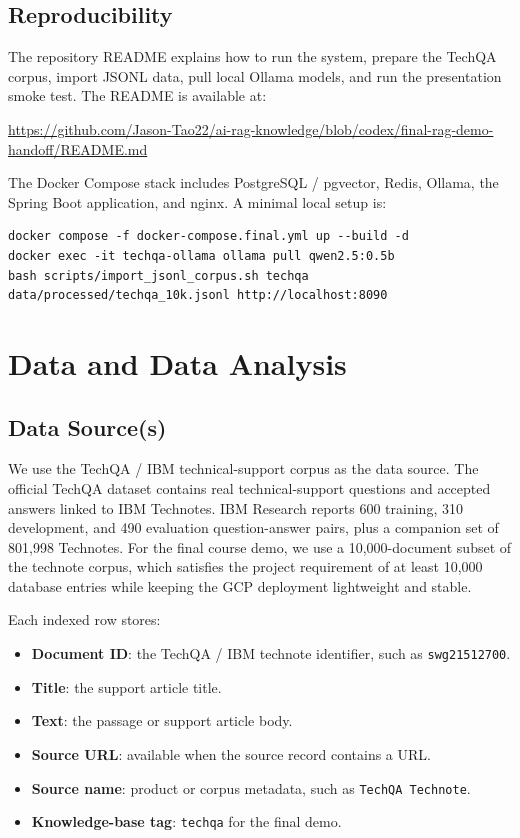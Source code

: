 \documentclass[paper=a4, fontsize=11pt]{scrartcl}
\begin{document}
\subsection{Reproducibility}

The repository README explains how to run the system, prepare the TechQA corpus, import JSONL data, pull local Ollama models, and run the presentation smoke test. The README is available at:

\begin{center}
\href{https://github.com/Jason-Tao22/ai-rag-knowledge/blob/codex/final-rag-demo-handoff/README.md}{https://github.com/Jason-Tao22/ai-rag-knowledge/blob/codex/final-rag-demo-handoff/README.md}
\end{center}

The Docker Compose stack includes PostgreSQL / pgvector, Redis, Ollama, the Spring Boot application, and nginx. A minimal local setup is:

\begin{verbatim}
docker compose -f docker-compose.final.yml up --build -d
docker exec -it techqa-ollama ollama pull qwen2.5:0.5b
bash scripts/import_jsonl_corpus.sh techqa data/processed/techqa_10k.jsonl http://localhost:8090
\end{verbatim}

\section{Data and Data Analysis}

\subsection{Data Source(s)}

We use the TechQA / IBM technical-support corpus as the data source. The official TechQA dataset contains real technical-support questions and accepted answers linked to IBM Technotes. IBM Research reports 600 training, 310 development, and 490 evaluation question-answer pairs, plus a companion set of 801,998 Technotes. For the final course demo, we use a 10,000-document subset of the technote corpus, which satisfies the project requirement of at least 10,000 database entries while keeping the GCP deployment lightweight and stable.

Each indexed row stores:

\begin{itemize}[leftmargin=*]
    \item \textbf{Document ID}: the TechQA / IBM technote identifier, such as \texttt{swg21512700}.
    \item \textbf{Title}: the support article title.
    \item \textbf{Text}: the passage or support article body.
    \item \textbf{Source URL}: available when the source record contains a URL.
    \item \textbf{Source name}: product or corpus metadata, such as \texttt{TechQA Technote}.
    \item \textbf{Knowledge-base tag}: \texttt{techqa} for the final demo.
\end{itemize}
\end{document}
